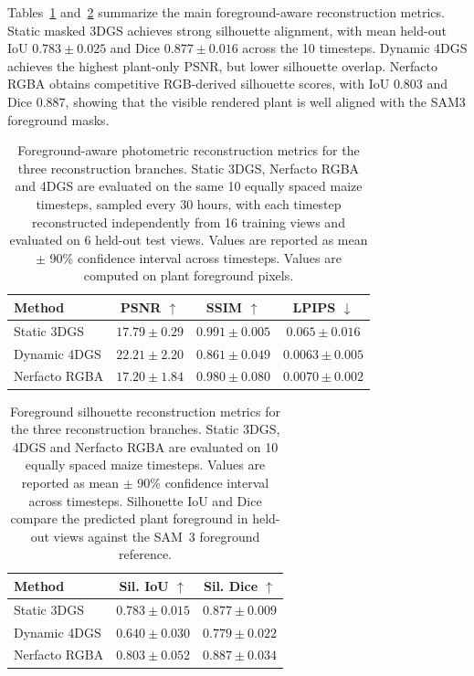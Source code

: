 \documentclass[sigconf]{acmart}
\begin{document}
Tables~\ref{tab:photometric_results} and~\ref{tab:silhouette_results} summarize the main foreground-aware reconstruction metrics. Static masked 3DGS achieves strong silhouette alignment, with mean held-out IoU $0.783 \pm 0.025$ and Dice $0.877 \pm 0.016$ across the 10 timesteps. Dynamic 4DGS achieves the highest plant-only PSNR, but lower silhouette overlap. Nerfacto RGBA obtains competitive RGB-derived silhouette scores, with IoU $0.803$ and Dice $0.887$, showing that the visible rendered plant is well aligned with the SAM3 foreground masks.

\begin{table}[t]
\centering
\setlength{\tabcolsep}{3pt}
\begin{tabular}{lccc}
\toprule
Method 
& PSNR $\uparrow$ 
& SSIM $\uparrow$ 
& LPIPS $\downarrow$ \\
\midrule
Static 3DGS 
& $17.79 \pm 0.29$ 
& $\mathbf{0.991 \pm 0.005}$ 
& $0.065 \pm 0.016$ \\

Dynamic 4DGS 
& $\mathbf{22.21 \pm 2.20}$
& $0.861 \pm 0.049$
& $0.0063 \pm 0.005$\\

Nerfacto RGBA 
& $17.20 \pm 1.84$
& $0.980 \pm 0.080$
& $\mathbf{0.0070 \pm 0.002}$ \\
\bottomrule
\end{tabular}
\caption{
Foreground-aware photometric reconstruction metrics for the three reconstruction branches. 
Static 3DGS, Nerfacto RGBA and 4DGS are evaluated on the same 10 equally spaced maize timesteps, sampled every 30 hours, with each timestep reconstructed independently from 16 training views and evaluated on 6 held-out test views.  
Values are reported as mean $\pm$ 90\% confidence interval across timesteps. Values are computed on plant foreground pixels.
}
\label{tab:photometric_results}
\vspace{-0.8em}
\end{table}

\begin{table}[t]
\centering
\setlength{\tabcolsep}{5pt}
\begin{tabular}{lcc}
\toprule
Method 
& Sil. IoU $\uparrow$ 
& Sil. Dice $\uparrow$ \\
\midrule
Static 3DGS 
& $0.783 \pm 0.015$
& $0.877 \pm 0.009$ \\

Dynamic 4DGS 
& $0.640 \pm 0.030$
& $0.779 \pm 0.022$ \\

Nerfacto RGBA 
& $\mathbf{0.803 \pm 0.052}$
& $\mathbf{0.887 \pm 0.034}$ \\
\bottomrule
\end{tabular}
\caption{
Foreground silhouette reconstruction metrics for the three reconstruction branches. 
Static 3DGS, 4DGS and Nerfacto RGBA are evaluated on 10 equally spaced maize timesteps.
Values are reported as mean $\pm$ 90\% confidence interval across timesteps. 
Silhouette IoU and Dice compare the predicted plant foreground in held-out views against the SAM~3 foreground reference. 
}
\label{tab:silhouette_results}
\vspace{-0.8em}
\end{table}
\end{document}

